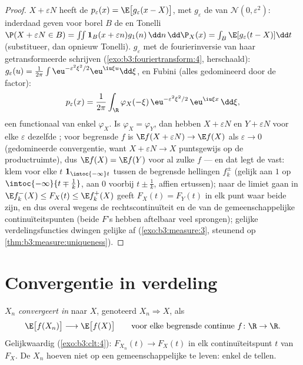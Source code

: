 \begin{proof}
$X + \varepsilon N$ heeft de  $p_\varepsilon(x) =
\E\bigl[g_\varepsilon(x - X)\bigr]$, met $g_\varepsilon$ de
 van $\mathcal N(0, \varepsilon^2)$: inderdaad geven
voor borel $B$ de  en Tonelli $\P(X +
\varepsilon N \in B) = \int\!\!\int\mathbf 1_B(x + \varepsilon
n)g_1(n)\,\dd n\,\dd\P_X(x) = \int_B\E[g_\varepsilon(t - X)]\dd
t$ (substitueer, dan opnieuw Tonelli). $g_\varepsilon$ met de
fourierinversie van haar getransformeerde schrijven
(\cref{exo:b3:fouriertransform:4}, herschaald): $g_\varepsilon(u)
= \frac1{2\pi}\int \eu^{-\varepsilon^2\xi^2/2}\eu^{\iu\xi u}\dd
\xi$, en Fubini (alles gedomineerd door de  factor):
\[
p_\varepsilon(x) = \frac1{2\pi}\int_\R
\varphi_X(-\xi)\,\eu^{-\varepsilon^2\xi^2/2}\,
\eu^{\iu\xi x}\,\dd\xi ,
\]
een functionaal van enkel $\varphi_X$. Is $\varphi_X =
\varphi_Y$, dan hebben $X + \varepsilon N$ en $Y + \varepsilon N$
voor elke $\varepsilon$ dezelfde ; voor begrensde
 $f$ is $\E f(X + \varepsilon N) \to \E f(X)$ als
$\varepsilon \to 0$ (gedomineerde convergentie, want $X +
\varepsilon N \to X$ puntsgewijs op de productruimte), dus $\E
f(X) = \E f(Y)$ voor al zulke $f$ --- en dat legt de 
vast: klem voor elke $t$ $\mathbf 1_{\intoc{-\infty}t}$ tussen de
begrensde  hellingen $f_k^\pm$ (gelijk aan $1$ op
$\intoc{-\infty}{t \mp \frac1k}$, aan $0$ voorbij $t \pm
\frac1k$, affien ertussen); naar de limiet gaan in $\E f_k^-(X)
\leq F_X(t) \leq \E f_k^+(X)$ geeft $F_X(t) = F_Y(t)$ in elk punt
waar beide  zijn, en dus overal wegens de
rechtscontinuïteit en de  van de gemeenschappelijke
continuïteitspunten (beide $F$'s hebben aftelbaar veel
sprongen); gelijke verdelingsfuncties dwingen gelijke 
af (\cref{exo:b3:measure:3}, steunend op
\cref{thm:b3:measure:uniqueness}).
\end{proof}

\section{Convergentie in verdeling}

\begin{definition}\label{def:b3:clt:cid}
$X_n$ \emph{convergeert in } naar $X$, genoteerd $X_n
\Rightarrow X$, als
\[
\E\bigl[f(X_n)\bigr] \longrightarrow \E\bigl[f(X)\bigr]
\qquad\text{voor elke begrensde continue } f\colon\R\to\R .
\]
Gelijkwaardig (\cref{exo:b3:clt:4}): $F_{X_n}(t) \to F_X(t)$ in
elk continuïteitspunt $t$ van $F_X$. De $X_n$ hoeven niet op een
gemeenschappelijke  te leven: enkel de 
tellen.
\end{definition}

